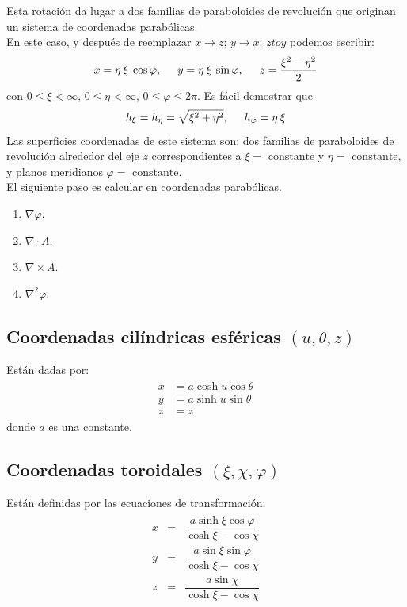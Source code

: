 \par
Esta rotación da lugar a dos familias de paraboloides de revolución que originan un sistema de coordenadas parabólicas.
\\
En este caso, y después de reemplazar $x \to z$; $y \to x$; $z to y$ podemos escribir:
\[ x = \eta \: \xi \: \cos \varphi, \hspace{0.5cm} y = \eta \: \xi \: \sin \varphi, \hspace{0.5cm} z = \dfrac{\xi^{2} -\eta^{2}}{2} \]
con $0 \leq \xi < \infty$, $0 \leq \eta < \infty$, $0 \leq \varphi \leq 2 \pi$. Es fácil demostrar que
\[ h_{\xi} = h_{\eta} = \sqrt{\xi^{2} + \eta^{2}}, \hspace{0.5cm} h_{\varphi} = \eta \: \xi  \]
Las superficies coordenadas de este sistema son: dos familias de paraboloides de revolución alrededor del eje $z$ correspondientes a $\xi = \mbox{ constante}$ y $\eta = \mbox{ constante}$, y planos meridianos $\varphi = \mbox{ constante}$.
\\
El siguiente paso es calcular en coordenadas parabólicas.
\begin{enumerate}
\item $\nabla \varphi$.
\item $\nabla \cdot A$.
\item $\nabla \times A$.
\item $\nabla^{2} \varphi$.
\end{enumerate}
\subsection*{Coordenadas cilíndricas esféricas $(u, \theta, z)$}
Están dadas por:
\begin{eqnarray}
\begin{aligned}
x &= a \cosh u \cos \theta \\
y &= a \sinh u \sin \theta \\
z &= z
\end{aligned}
\end{eqnarray}
donde $a$ es una constante.
\subsection*{Coordenadas toroidales $(\xi,\chi,\varphi)$}
Están definidas por las ecuaciones de transformación:
\begin{eqnarray}
\begin{aligned}
x &=& \dfrac{a \sinh \xi \cos \varphi}{\cosh \xi - \cos \chi} \\
y &=& \dfrac{a \sin  \xi \sin \varphi}{\cosh \xi - \cos \chi} \\
z &=& \dfrac{a \sin \chi}{\cosh \xi - \cos \chi}
\end{aligned}
\end{eqnarray}
